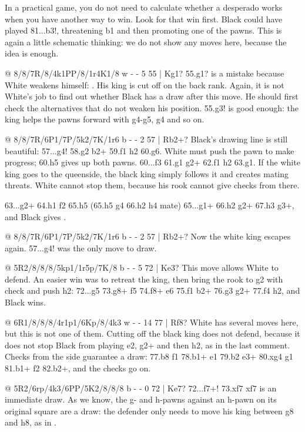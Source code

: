 In a practical game, you do not need to calculate whether a desperado works when you have another
way to win. Look for that win first. Black could have played 81...\R b3!, threatening \R b1 and
then promoting one of the pawns. This is again a little schematic thinking:
we do not show any moves here, because the idea is enough.

@ 8/8/7R/8/4k1PP/8/1r4K1/8 w - - 5 55 | Kg1?
55.\K g1? is a mistake because White weakens himself: . His king is cut off on
the back rank. Again, it is not White's job to find out whether Black has a draw after this move.
He should first check the alternatives that do not weaken his position. 55.\K g3! is good enough:
the king helps the pawns forward with g4-g5, \K g4 and so on.

@ 8/8/7R/6P1/7P/5k2/7K/1r6 b - - 2 57 | Rb2+?
Black's drawing line is still beautiful: 57...\K g4! 58.\K g2 \R b2+
59.\K f1 \R h2 60.g6. White must push the pawn to make progress; 60.h5 gives up both pawns.
60...\K f3 61.\K g1 \R g2+ 62.\K f1 \R h2 63.\K g1. If the white king goes to the queenside,
the black king simply follows it and creates mating threats. White cannot stop them, because
his rook cannot give checks from there.

63...\R g2+ 64.\K h1 \K f2 65.\R h5 (65.h5 \R g4 66.\K h2 \R h4 mate) 65...\R g1+ 66.\K h2 \R g2+
67.\K h3 \R g3+, and Black gives .

@ 8/8/7R/6P1/7P/5k2/7K/1r6 b - - 2 57 | Rb2+?
Now the white king escapes again. 57...\K g4! was the only move to draw.

@ 5R2/8/8/8/5kp1/1r5p/7K/8 b - - 5 72 | Ke3?
This move allows White to defend. An easier win was to retreat the king, then bring the rook to
g2 with check and push h2: 72...\K g5 73.\R g8+ \K f5 74.\R f8+ \K e6 75.\R f1 \R b2+ 76.\K g3
\R g2+ 77.\K f4 h2, and Black wins.

@ 6R1/8/8/8/4r1p1/6Kp/8/4k3 w - - 14 77 | Rf8?
White has several moves here, but this is not one of them. Cutting off the black king does not
defend, because it does not stop Black from playing \R e2, \R g2+ and then h2, as in the last
comment. Checks from the side guarantee a draw: 77.\R b8 \K f1 78.\R b1+ \R e1 79.\R b2 \R e3+
80.\K xg4 \K g1 81.\R b1+ \K f2 82.\R b2+, and the checks go on.

@ 5R2/6rp/4k3/6PP/5K2/8/8/8 b - - 0 72 | Ke7?
72...\R f7+! 73.\R xf7 \K xf7 is an immediate draw. As we know, the g- and h-pawns against an
h-pawn on its original square are a draw: the defender only needs to move his king between g8 and h8, as in
.

